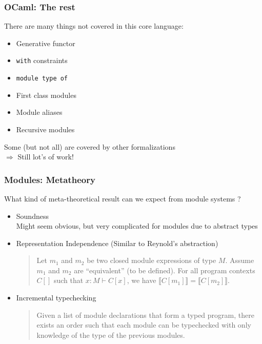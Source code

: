\documentclass[aspectratio=169,dvipsnames,svgnames,10pt]{beamer}
\begin{document}
\begin{frame}
  \frametitle{OCaml: The rest}

  There are many things not covered in this core language:
  \begin{itemize}
  \item Generative functor
  \item \texttt{with} constraints
  \item \texttt{module type of}
  \item First class modules
  \item Module aliases
  \item Recursive modules
  \end{itemize}

  Some (but not all) are covered by other formalizations\\
  $\Rightarrow$ Still lot's of work!
\end{frame}

\begin{frame}
  \frametitle{Modules: Metatheory}

  What kind of meta-theoretical result can we expect from module systems ?
  \begin{itemize}
  \item Soundness\\
    Might seem obvious, but very complicated for modules due to abstract types
  \item Representation Independence (Similar to Reynold's abstraction)\\
    \begin{quote}
      Let $m_1$ and $m_2$ be two closed module expressions of type $M$.
      Assume $m_1$ and $m_2$ are ``equivalent'' (to be defined).
      For all program contexts $C[ ]$ such that $x : M \vdash C[x]$, we have
      $\llbracket C[m_1] \rrbracket = \llbracket C[m_2] \rrbracket$.
    \end{quote}
  \item Incremental typechecking\\
    \begin{quote}
      Given a list of module declarations that form a typed program, there exists an order such that each module can be typechecked with only knowledge of the type of the previous modules.
    \end{quote}
  \end{itemize}
  
\end{frame}
\end{document}
